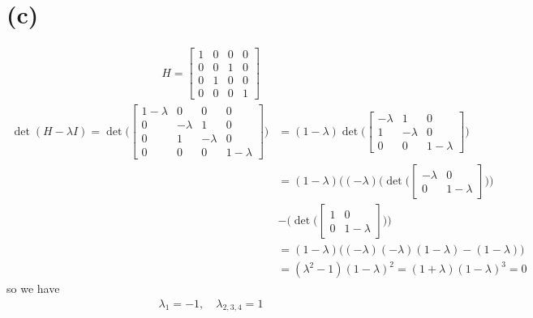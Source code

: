 \documentclass{article}
\begin{document}
\section*{(c)}
\begin{align*}
   H = \begin{bmatrix}
      1 & 0 & 0 & 0 \\
      0 & 0 & 1 & 0 \\
      0 & 1 & 0 & 0 \\
      0 & 0 & 0 & 1
      \end{bmatrix}
\end{align*}
\begin{align*}
   \det(H - \lambda I) = \det\bigg(\begin{bmatrix}
      1-\lambda & 0 & 0 & 0 \\
      0 & -\lambda & 1 & 0 \\
      0 & 1 & -\lambda & 0 \\
      0 & 0 & 0 & 1-\lambda
      \end{bmatrix}
      \bigg) &= (1-\lambda)\det\bigg(\begin{bmatrix}
         -\lambda & 1 & 0 \\
         1 & -\lambda & 0 \\
         0 & 0 & 1-\lambda
         \end{bmatrix}\bigg) \\
      &= (1-\lambda)\bigg((-\lambda)(\det\bigg(\begin{bmatrix}
         -\lambda & 0 \\
         0 & 1-\lambda
         \end{bmatrix}\bigg)\big) \\ &-(\det\bigg(\begin{bmatrix}
            1 & 0 \\
            0 & 1-\lambda
            \end{bmatrix}\bigg)\bigg) \\
         &= (1-\lambda)\bigg((-\lambda)(-\lambda)(1-\lambda) - (1-\lambda)\bigg) \\
         &= (\lambda^2 - 1)(1-\lambda)^2 = (1+\lambda)(1-\lambda)^3 = 0
\end{align*}
so we have
\begin{align*}
   \lambda_1 = -1, \quad
   \lambda_{2,3,4} = 1
\end{align*}
\end{document}
